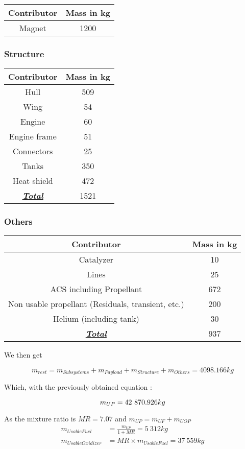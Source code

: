 \begin{longtable}[]{@{}cc@{}}
\toprule
Contributor & Mass in kg\tabularnewline
\midrule
\endhead
Magnet & 1200\tabularnewline
\bottomrule
\end{longtable}


\subsubsection{Structure}

\begin{longtable}[]{@{}cc@{}}
\toprule
Contributor & Mass in kg\tabularnewline
\midrule
\endhead
Hull & 509\tabularnewline
Wing & 54\tabularnewline
Engine & 60\tabularnewline
Engine frame & 51\tabularnewline
Connectors & 25\tabularnewline
Tanks & 350\tabularnewline
Heat shield & 472\tabularnewline
\underline{\textbf{\emph{Total}}} & 1521\tabularnewline
\bottomrule
\end{longtable}


\subsubsection{Others}

\begin{longtable}[]{@{}cc@{}}
\toprule
Contributor & Mass in kg\tabularnewline
\midrule
\endhead
Catalyzer & 10\tabularnewline
Lines & 25\tabularnewline
ACS including Propellant & 672\tabularnewline
Non usable propellant (Residuals, transient, etc.) & 200\tabularnewline
Helium (including tank) & 30\tabularnewline
\underline{\textbf{\emph{Total}}} & 937\tabularnewline
\bottomrule
\end{longtable}

We then get

\[m_{rest} = m_{Sub systems} + m_{Payload} + m_{Structure} + m_{Others} = 4098.166kg\]

Which, with the previously obtained equation :

\[m_{UP} = 42\ 870.926kg\\\]

As the mixture ratio is $MR = 7.07$ and $m_{UP} = m_{UF} + m_{UOP}$\\
\begin{align*}
m_{UsableFuel} &= \frac{m_{UP}}{1 + MR} = 5\ 312kg\\
m_{UsableOxidizer} &= MR \times m_{UsableFuel} =37\ 559kg
\end{align*}

